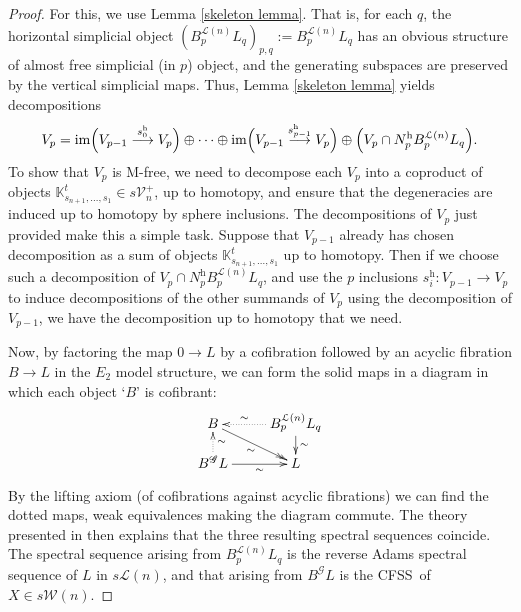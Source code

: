 \documentclass[11pt]{amsart} \renewcommand{\baselinestretch}{1.2}
\theoremstyle{plain}
\numberwithin{equation}{section} %
\theoremstyle{plain}
\numberwithin{equation}{chapter} %
\DeclareMathOperator{\im}{im}
\renewcommand{\to}{\longrightarrow}
\newcommand{\scrG}{\mathscr{G}}
\newcommand{\calL}{\mathcal{L}}
\newcommand{\calV}{\mathcal{V}}
\newcommand{\calw}{\mathcal{W}}
\newcommand{\vect}[2]{\calV^{#1}_{#2}}
\newcommand{\BSW}{{\scrG}}
\newcommand{\uhor}{^\mathrm{h}}
\newcommand{\CFSS}{CFSS}
\begin{document}
\begin{Comp funct sseqs}
\begin{proof}
For this, we use Lemma \ref{skeleton lemma}. That is, for each $q$, the horizontal simplicial object $(B^{\calL(n)}_pL_q)_{p,q}:=B^{\calL(n)}_pL_q$ has an obvious structure of almost free simplicial (in $p$) object, and the generating subspaces are preserved by the vertical simplicial maps. Thus, Lemma \ref{skeleton lemma} yields decompositions
\[V_p=\im\Bigl(V_{p-1}\overset{s\uhor_0}{\to}V_p\Bigr)\oplus\cdots \oplus \im\Bigl(V_{p-1}\overset{s\uhor_{p-1}}{\to}V_p\Bigr)\oplus \Bigl(V_p\cap N\uhor_pB^{\calL(n)}_pL_q\Bigr).\]
To show that $V_p$ is M-free, we need to decompose each $V_p$ into a coproduct of objects $\mathbb{K}_{s_{n+1},\ldots,s_1}^t\in s\vect{+}{n}$, up to homotopy, and ensure that the degeneracies are induced up to homotopy by sphere inclusions. The decompositions of $V_p$ just provided make this a simple task.
Suppose that $V_{p-1}$ already has chosen decomposition as a sum of objects $\mathbb{K}_{s_{n+1},\ldots,s_1}^t$ up to homotopy. Then if we choose such a decomposition of $V_p\cap N\uhor_p B^{\calL(n)}_pL_q$, and use the $p$ inclusions $s\uhor_i:V_{p-1}\to V_p$ to induce decompositions of the other summands of $V_p$ using the decomposition of $V_{p-1}$, we have the decomposition up to homotopy that we need.

Now, by factoring the map $0\to L$ by a cofibration followed by an acyclic fibration $B\to L$ in the $E_2$ model structure, we can form the solid maps in a diagram in which each object `$B$' is cofibrant:
\[\xymatrix@R=4mm{
B\ar@{->>}[dr]_-{\sim}
&%
B^{\calL(n)}_pL_q\ar[d]^-{\sim}\ar@{..>}[l]_-{\sim}\\%
B^{\BSW}L\ar[r]_-{\sim}\ar@{..>}[u]_-{\sim}&%
L%
}\]
By the lifting axiom (of cofibrations against acyclic fibrations) we can find the dotted maps, weak equivalences making the diagram commute. The theory presented in \cite{DKS.pdf} then explains that the three resulting spectral sequences  coincide. The spectral sequence arising from $B^{\calL(n)}_pL_q$ is the reverse Adams spectral sequence of $L$ in $s\calL(n)$, and that arising from $B^{\BSW}L$ is the \CFSS\ of $X\in s\calw(n)$.
\end{proof}
\end{Comp funct sseqs}
\end{document}
